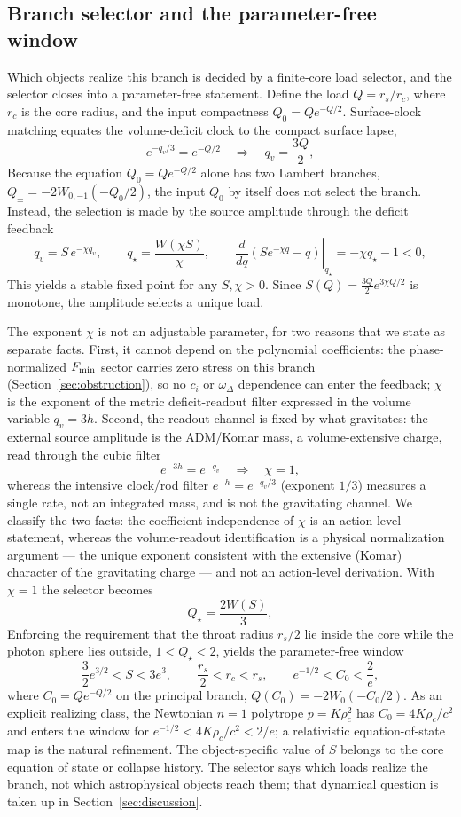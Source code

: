 \documentclass[12pt,a4paper]{article}
\begin{document}
\subsection{Branch selector and the parameter-free window}
\label{sec:selector}

Which objects realize this branch is decided by a finite-core load selector,
and the selector closes into a parameter-free statement. Define the load
$Q=r_s/r_c$, where $r_c$ is the core radius, and the input compactness
$Q_0=Qe^{-Q/2}$. Surface-clock matching equates the volume-deficit clock to
the compact surface lapse,
\[
e^{-q_v/3}=e^{-Q/2}\quad\Longrightarrow\quad q_v=\frac{3Q}{2},
\]
Because the equation $Q_0=Qe^{-Q/2}$ alone has two Lambert branches,
$Q_\pm=-2W_{0,-1}(-Q_0/2)$, the input $Q_0$ by itself does not select the
branch. Instead, the selection is made by the source amplitude through the
deficit feedback
\[
q_v=S\,e^{-\chi q_v},\qquad
q_\star=\frac{W(\chi S)}{\chi},\qquad
\left.\frac{d}{dq}\left(Se^{-\chi q}-q\right)\right|_{q_\star}
=-\chi q_\star-1<0,
\]
This yields a stable fixed point for any $S,\chi>0$. Since
$S(Q)=\tfrac{3Q}{2}e^{3\chi Q/2}$ is monotone, the amplitude selects a unique
load.

The exponent $\chi$ is not an adjustable parameter, for two reasons that we
state as separate facts. First, it cannot depend on the polynomial
coefficients: the phase-normalized $F_{\rm min}$ sector carries zero stress
on this branch (Section~\ref{sec:obstruction}), so no $c_i$ or
$\omega_\Delta$ dependence can enter the feedback; $\chi$ is the exponent of
the metric deficit-readout filter expressed in the volume variable
$q_v=3h$. Second, the readout channel is fixed by what gravitates: the
external source amplitude is the ADM/Komar mass, a volume-extensive charge,
read through the cubic filter
\[
e^{-3h}=e^{-q_v}\quad\Longrightarrow\quad\chi=1,
\]
whereas the intensive clock/rod filter $e^{-h}=e^{-q_v/3}$ (exponent $1/3$)
measures a single rate, not an integrated mass, and is not the gravitating
channel. We classify the two facts: the coefficient-independence of
$\chi$ is an action-level statement, whereas the volume-readout
identification is a physical normalization argument --- the unique exponent
consistent with the extensive (Komar) character of the gravitating charge ---
and not an action-level derivation. With $\chi=1$ the selector becomes
\[
Q_\star=\frac{2W(S)}{3},
\]
Enforcing the requirement that the throat radius $r_s/2$ lie inside the
core while the photon sphere lies outside, $1<Q_\star<2$, yields the
parameter-free window
\[
\frac32e^{3/2}<S<3e^{3},
\qquad
\frac{r_s}{2}<r_c<r_s,
\qquad
e^{-1/2}<C_0<\frac{2}{e},
\]
where $C_0=Q e^{-Q/2}$ on the principal branch,
$Q(C_0)=-2W_0(-C_0/2)$. As an explicit realizing class, the Newtonian $n=1$
polytrope $p=K\rho_c^2$ has $C_0=4K\rho_c/c^2$ and enters the window for
$e^{-1/2}<4K\rho_c/c^2<2/e$; a relativistic equation-of-state map is the
natural refinement. The object-specific value of $S$ belongs to the core
equation of state or collapse history. The selector says which loads
realize the branch, not which astrophysical objects reach them; that
dynamical question is taken up in Section~\ref{sec:discussion}.
\end{document}
